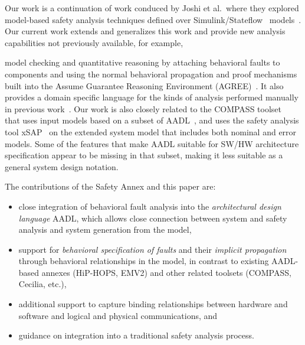 Our work is a continuation of work conduced by Joshi et al.~where they explored model-based safety analysis techniques defined over Simulink/Stateflow~\cite{Mathlab} models~\cite{Joshi05:SafeComp,Joshi07:Hase,Joshi05:Dasc}. Our current work extends and generalizes this work and provide new analysis capabilities not previously available, for example, 
{model checking and quantitative reasoning by attaching behavioral faults to components and using the normal behavioral propagation and proof mechanisms built into the Assume Guarantee Reasoning Environment (AGREE)~\cite{NFM2012:CoGaMiWhLaLu}. It also provides a domain specific language for the kinds of analysis performed manually in previous work~\cite{Stewart17:IMBSA}.
Our work is also closely related to the COMPASS toolset~\cite{10.1007/978-3-642-04468-7_15} that uses input models based on a subset of AADL~\cite{5185388, criticalembeddedsystems}, and uses the safety analysis tool xSAP~\cite{DBLP:conf/tacas/BittnerBCCGGMMZ16} on the extended system model that includes both nominal and error models. Some of the features that make AADL suitable for SW/HW architecture specification appear to be missing in that subset, making it less suitable as a general system design notation.

The contributions of the Safety Annex and this paper are:
\begin{itemize}
		\item close integration of behavioral fault analysis into the {\em architectural design language} AADL, which allows close connection between system and safety analysis and system generation from the model,
		\item support for {\em behavioral specification of faults} and their {\em implicit propagation} through behavioral relationships in the model, in contrast to existing AADL-based annexes (HiP-HOPS, EMV2) and other related toolsets (COMPASS, Cecilia, etc.),
		\item additional support to capture binding relationships between hardware and software and logical and physical communications, and
		\item guidance on integration into a traditional safety analysis process.
\end{itemize}


}
